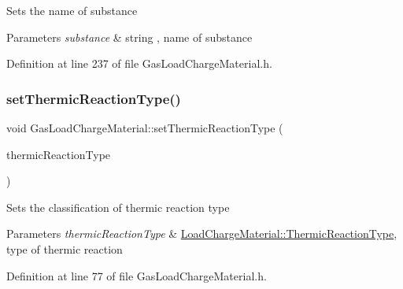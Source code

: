 Sets the name of substance 
\begin{DoxyParams}{Parameters}
{\em substance} & string , name of substance \\
\hline
\end{DoxyParams}


Definition at line 237 of file Gas\+Load\+Charge\+Material.\+h.

\mbox{\label{class_gas_load_charge_material_ac48eb07a3008f1dc0ff433353b59536d}} 
\subsubsection{\texorpdfstring{set\+Thermic\+Reaction\+Type()}{setThermicReactionType()}\hspace{0.1cm}{\footnotesize\ttfamily [1/3]}}
{\footnotesize\ttfamily void Gas\+Load\+Charge\+Material\+::set\+Thermic\+Reaction\+Type (\begin{DoxyParamCaption}\item[{\hyperlink{namespace_load_charge_material_a51d4263e865a5d86236622dd3fe23fd1}{Load\+Charge\+Material\+::\+Thermic\+Reaction\+Type}}]{thermic\+Reaction\+Type }\end{DoxyParamCaption})\hspace{0.3cm}{\ttfamily [inline]}}

Sets the classification of thermic reaction type 
\begin{DoxyParams}{Parameters}
{\em thermic\+Reaction\+Type} & \hyperlink{namespace_load_charge_material_a51d4263e865a5d86236622dd3fe23fd1}{Load\+Charge\+Material\+::\+Thermic\+Reaction\+Type}, type of thermic reaction \\
\hline
\end{DoxyParams}


Definition at line 77 of file Gas\+Load\+Charge\+Material.\+h.

\mbox{\label{class_gas_load_charge_material_ac48eb07a3008f1dc0ff433353b59536d}} 
